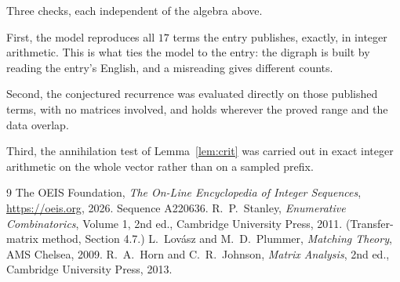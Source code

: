 \documentclass[11pt,a4paper]{article}
\theoremstyle{plain}
\theoremstyle{definition}
\begin{document}
Three checks, each independent of the algebra above.

First, the model reproduces all $17$ terms the entry publishes, exactly, in integer
arithmetic. This is what ties the model to the entry: the digraph is built by reading the
entry's English, and a misreading gives different counts.

Second, the conjectured recurrence was evaluated directly on those published terms, with no
matrices involved, and holds wherever the proved range and the data overlap.

Third, the annihilation test of Lemma~\ref{lem:crit} was carried out in exact integer
arithmetic on the whole vector rather than on a sampled prefix.

\begin{thebibliography}{9}
 The OEIS Foundation, \emph{The On-Line Encyclopedia of Integer
Sequences}, \url{https://oeis.org}, 2026. Sequence A220636.
 R.~P.~Stanley, \emph{Enumerative Combinatorics}, Volume 1, 2nd ed.,
Cambridge University Press, 2011. (Transfer-matrix method, Section 4.7.)
 L.~Lov\'asz and M.~D.~Plummer, \emph{Matching Theory}, AMS Chelsea,
2009.
 R.~A.~Horn and C.~R.~Johnson, \emph{Matrix Analysis}, 2nd ed., Cambridge
University Press, 2013.
\end{thebibliography}
\end{document}
